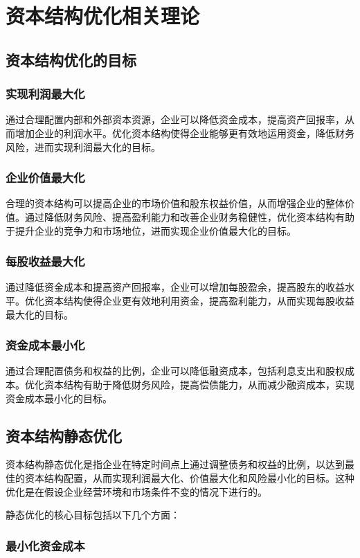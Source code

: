 \section{资本结构优化相关理论}
\subsection{资本结构优化的目标}
\subsubsection{实现利润最大化}
通过合理配置内部和外部资本资源，企业可以降低资金成本，提高资产回报率，从而增加企业的利润水平。优化资本结构使得企业能够更有效地运用资金，降低财务风险，进而实现利润最大化的目标。
\subsubsection{企业价值最大化}
合理的资本结构可以提高企业的市场价值和股东权益价值，从而增强企业的整体价值。通过降低财务风险、提高盈利能力和改善企业财务稳健性，优化资本结构有助于提升企业的竞争力和市场地位，进而实现企业价值最大化的目标。
\subsubsection{每股收益最大化}
通过降低资金成本和提高资产回报率，企业可以增加每股盈余，提高股东的收益水平。优化资本结构使得企业更有效地利用资金，提高盈利能力，从而实现每股收益最大化的目标。
\subsubsection{资金成本最小化}
通过合理配置债务和权益的比例，企业可以降低融资成本，包括利息支出和股权成本。优化资本结构有助于降低财务风险，提高偿债能力，从而减少融资成本，实现资金成本最小化的目标。
\subsection{资本结构静态优化}
资本结构静态优化是指企业在特定时间点上通过调整债务和权益的比例，以达到最佳的资本结构配置，从而实现利润最大化、价值最大化和风险最小化的目标。这种优化是在假设企业经营环境和市场条件不变的情况下进行的。

静态优化的核心目标包括以下几个方面：

\subsubsection{最小化资金成本}

